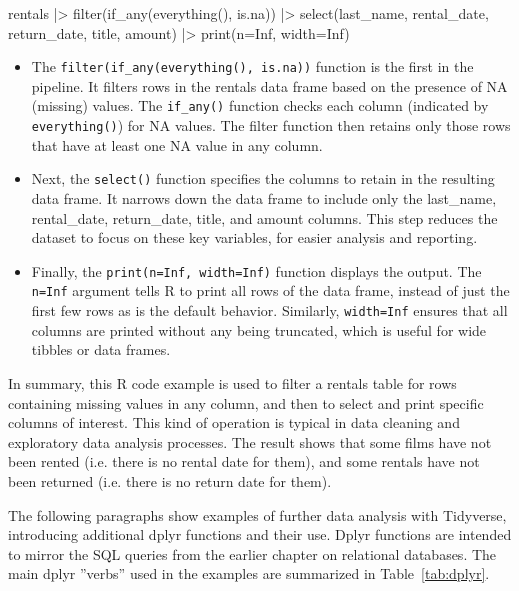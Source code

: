 \begin{samepage}
\begin{Rcode}
rentals |> 
  filter(if_any(everything(), is.na)) |>
  select(last_name, rental_date, return_date, title, amount) |>
  print(n=Inf, width=Inf)
\end{Rcode}
\end{samepage}

\begin{itemize}
\item The \texttt{filter(if\_any(everything(), is.na))} function is the first in the pipeline. It filters rows in the rentals data frame based on the presence of NA (missing) values. The \texttt{if\_any()} function checks each column (indicated by \texttt{everything()}) for NA values. The filter function then retains only those rows that have at least one NA value in any column.

\item Next, the \texttt{select()} function specifies the columns to retain in the resulting data frame. It narrows down the data frame to include only the last\_name, rental\_date, return\_date, title, and amount columns. This step reduces the dataset to focus on these key variables, for easier analysis and reporting.

\item Finally, the \texttt{print(n=Inf, width=Inf)} function displays the output. The \texttt{n=Inf} argument tells R to print all rows of the data frame, instead of just the first few rows as is the default behavior. Similarly, \texttt{width=Inf} ensures that all columns are printed without any being truncated, which is useful for wide tibbles or data frames.
\end{itemize}

In summary, this R code example is used to filter a rentals table for rows containing missing values in any column, and then to select and print specific columns of interest. This kind of operation is typical in data cleaning and exploratory data analysis processes. The result shows that some films have not been rented (i.e. there is no rental date for them), and some rentals have not been returned (i.e. there is no return date for them).

The following paragraphs show examples of further data analysis with Tidyverse, introducing additional dplyr functions and their use. Dplyr functions are intended to mirror the SQL queries from the earlier chapter on relational databases. The main dplyr ''verbs'' used in the examples are summarized in Table~\ref{tab:dplyr}. 

